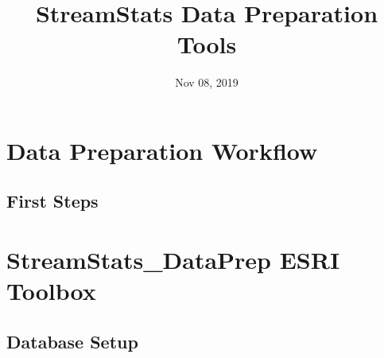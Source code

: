 \documentclass[letterpaper,10pt,english]{sphinxmanual}
\title{StreamStats Data Preparation Tools}
\date{Nov 08, 2019}
\author{}
\begin{document}
\pagestyle{empty}
\sphinxmaketitle
\pagestyle{plain}
\sphinxtableofcontents
\pagestyle{normal}
\label{\detokenize{index::doc}}



\chapter{Data Preparation Workflow}
\label{\detokenize{workflow:data-preparation-workflow}}\label{\detokenize{workflow::doc}}

\section{First Steps}
\label{\detokenize{firstSteps:first-steps}}\label{\detokenize{firstSteps::doc}}
\noindent{}


\chapter{StreamStats\_DataPrep ESRI Toolbox}
\label{\detokenize{StreamStats_DataPrep:streamstats-dataprep-esri-toolbox}}\label{\detokenize{StreamStats_DataPrep::doc}}

\section{Database Setup}
\label{\detokenize{StreamStats_DataPrep:database-setup}}
\end{document}

